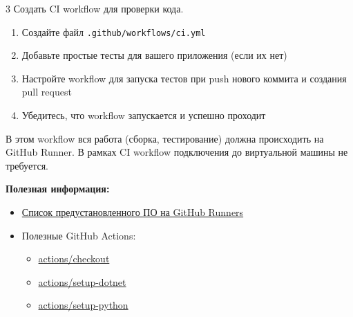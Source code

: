 \documentclass[12pt,a4paper]{article}
\begin{document}
\begin{task}{3}
    Создать CI workflow для проверки кода.
    
    \begin{enumerate}
        \item Создайте файл \texttt{.github/workflows/ci.yml}
        \item Добавьте простые тесты для вашего приложения (если их нет)
        \item Настройте workflow для запуска тестов при push нового коммита и создания pull request
        \item Убедитесь, что workflow запускается и успешно проходит
    \end{enumerate}

    В этом workflow вся работа (сборка, тестирование) должна происходить на GitHub Runner.
    В рамках CI workflow подключения до виртуальной машины не требуется.

    \textbf{Полезная информация:}
    \begin{itemize}
        \item \href{https://github.com/actions/runner-images?tab=readme-ov-file#available-images}{Список предустановленного ПО на GitHub Runners}
        \item Полезные GitHub Actions: 
        \begin{itemize}
            \item \href{https://github.com/actions/checkout}{actions/checkout}
            \item \href{https://github.com/actions/setup-dotnet}{actions/setup-dotnet}
            \item \href{https://github.com/actions/setup-python}{actions/setup-python}
        \end{itemize}
    \end{itemize}
\end{task}
\end{document}
